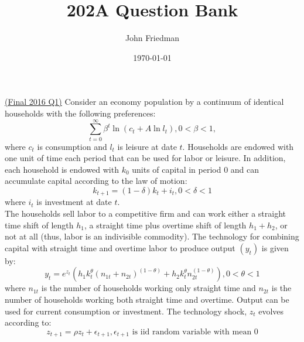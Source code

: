 \documentclass[answers]{exam}
\title{202A Question Bank}
\author{John Friedman}
\date{\today}
\begin{document}
\maketitle

\begin{questions}
    \question \href{https://drive.google.com/file/d/1Oc2RsQ-J3MtMMVoAwpuAdPodoOrIJZmm/view}{(Final 2016 Q1)}
    Consider an economy population by a continuum of identical households with the following preferences:
    $$\sum_{t=0}^{\infty} \beta^t \ln(c_t + A \ln l_t), 0 < \beta < 1, $$
    where $c_t$ is consumption and $l_t$ is leisure at date $t$. Households are endowed with one unit of time each period that can be used for labor or leisure. In addition, each household is endowed with $k_0$ units of capital in period 0 and can accumulate capital according to the law of motion:
    $$k_{t+1} = (1-\delta) k_t + i_t, 0 < \delta < 1$$
    where $i_t$ is investment at date $t$.\\
    The households sell labor to a competitive firm and can work either a straight time shift of length $h_1$, a straight time plus overtime shift of length $h_1+h_2$, or not at all (thus, labor is an indivisible commodity). The technology for combining capital with straight time and overtime labor to produce output $(y_t)$ is given by:
    $$y_t = e^{z_t}(h_1 k_t^\theta (n_{1t}+n_{2t})^{(1-\theta)} + h_2 k_t^\theta n_{2t}^{(1-\theta)}), 0 < \theta < 1$$
    where $n_{1t}$ is the number of households working only straight time and $n_{2t}$ is the number of households working both straight time and overtime. Output can be used for current consumption or investment. The technology shock, $z_t$ evolves according to:
    $$z_{t+1} = \rho z_t + \epsilon_{t+1}, \epsilon_{t+1} \text{ is iid random variable with mean 0}$$
\end{questions}
\end{document}
